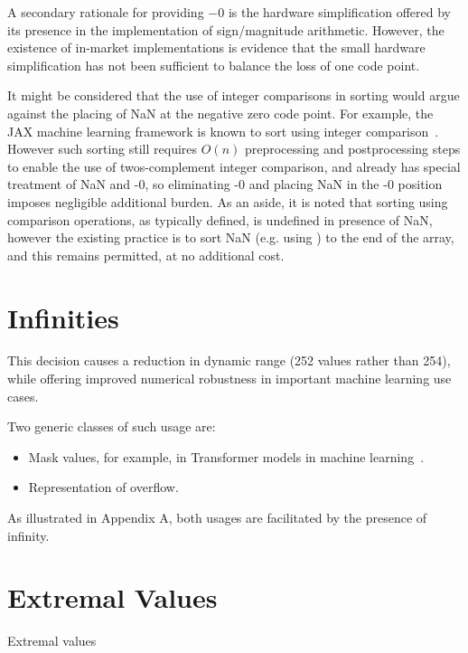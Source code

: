 \documentclass{article}
\begin{document}
A secondary rationale for providing $-0$ is the hardware simplification offered by its presence in the implementation of sign/magnitude arithmetic.   However, the existence of in-market implementations is evidence that the small hardware simplification has not been sufficient to balance the loss of one code point.

It might be considered that the use of integer comparisons in sorting would argue against the placing of NaN at the negative zero code point.
For example, the JAX machine learning framework is known to sort using integer comparison~\cite{jax:sort}.
However such sorting still requires $O(n)$ preprocessing and postprocessing steps to enable the use of twos-complement integer comparison, and already has special treatment of NaN and -0, so eliminating -0 and placing NaN in the -0 position imposes negligible additional burden.
As an aside, it is noted that sorting using comparison operations, as typically defined, is undefined in presence of NaN, however the existing practice is to sort NaN (e.g. using ) to the end of the array, and this remains permitted, at no additional cost.


\section{Infinities}


This decision causes a reduction in dynamic range (252 values rather than 254), while offering improved numerical robustness in important machine learning use cases.

Two generic classes of such usage are: 
\begin{itemize}
\item Mask values, for example, in Transformer models in machine learning~\cite{torchtext:inf}.  
\item Representation of overflow.  
\end{itemize}
As illustrated in Appendix A, both usages are facilitated by the presence of infinity.

\clearpage
\section{Extremal Values}

\begin{table}[tbh]
\centering

\caption{Extremal values}
\end{table}
\end{document}
